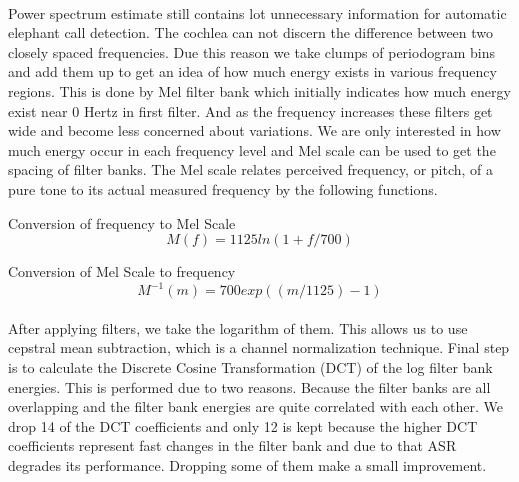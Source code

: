 \documentclass[12pt]{article}
\numberwithin{figure}{section}
\numberwithin{table}{section}
\begin{document}
\paragraph{}
Power spectrum estimate still contains lot unnecessary information for automatic elephant call detection. The cochlea can not discern the difference between two closely spaced frequencies. Due this reason we take clumps of periodogram bins and add them up to get an idea of how much energy exists in various frequency regions. This is done by Mel filter bank which initially indicates how much energy exist near 0 Hertz in first filter. And as the frequency increases these filters get wide and become less concerned about variations. We are only interested in how much energy occur in each frequency level and Mel scale can be used to get the spacing of filter banks. The Mel scale relates perceived frequency, or pitch, of a pure tone to its actual measured frequency by the following functions.

Conversion of frequency to Mel Scale 
\begin{equation}
M(f) = 1125 ln (1+f/700)
\end{equation}

Conversion of Mel Scale to frequency
\begin{equation}
M^{-1}(m) = 700 exp((m/1125)-1)
\end{equation} 

\paragraph{}
After applying filters, we take the logarithm of them. This allows us to use cepstral mean subtraction, which is a channel normalization technique. Final step is to calculate the Discrete Cosine Transformation (DCT) of the log filter bank energies. This is performed due to two reasons. Because the filter banks are all overlapping and the filter bank energies are quite correlated with each other. We drop 14 of the DCT coefficients and only 12 is kept because the higher DCT coefficients represent fast changes in the filter bank and due to that ASR degrades its performance. Dropping some of them make a small improvement.
\end{document}
